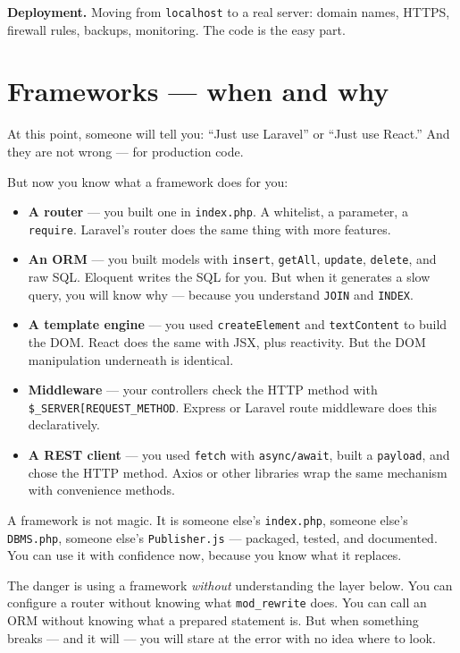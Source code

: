 \documentclass[11pt,a4paper,oneside]{book}
\providecommand{\tightlist}{%
  \setlength{\itemsep}{0pt}\setlength{\parskip}{0pt}}
\begin{document}
\textbf{Deployment.} Moving from \texttt{localhost} to a real
server: domain names, HTTPS, firewall rules, backups, monitoring.
The code is the easy part.

\hypertarget{frameworks-when-and-why}{%
\section{Frameworks --- when and
why}\label{frameworks-when-and-why}}

At this point, someone will tell you: ``Just use Laravel'' or
``Just use React.'' And they are not wrong --- for production
code.

But now you know what a framework does for you:

\begin{itemize}
\tightlist
\item
  \textbf{A router} --- you built one in \texttt{index.php}. A
  whitelist, a parameter, a \texttt{require}. Laravel's router
  does the same thing with more features.
\item
  \textbf{An ORM} --- you built models with \texttt{insert},
  \texttt{getAll}, \texttt{update}, \texttt{delete}, and raw SQL.
  Eloquent writes the SQL for you. But when it generates a slow
  query, you will know why --- because you understand
  \texttt{JOIN} and \texttt{INDEX}.
\item
  \textbf{A template engine} --- you used \texttt{createElement}
  and \texttt{textContent} to build the DOM. React does the same
  with JSX, plus reactivity. But the DOM manipulation underneath
  is identical.
\item
  \textbf{Middleware} --- your controllers check the HTTP method
  with
  \texttt{\$\_SERVER{[}\textquotesingle{}REQUEST\_METHOD\textquotesingle{}{]}}.
  Express or Laravel route middleware does this declaratively.
\item
  \textbf{A REST client} --- you used \texttt{fetch} with
  \texttt{async/await}, built a \texttt{payload}, and chose the
  HTTP method. Axios or other libraries wrap the same mechanism
  with convenience methods.
\end{itemize}

A framework is not magic. It is someone else's
\texttt{index.php}, someone else's \texttt{DBMS.php}, someone
else's \texttt{Publisher.js} --- packaged, tested, and
documented. You can use it with confidence now, because you know
what it replaces.

The danger is using a framework \emph{without} understanding the
layer below. You can configure a router without knowing what
\texttt{mod\_rewrite} does. You can call an ORM without knowing
what a prepared statement is. But when something breaks --- and
it will --- you will stare at the error with no idea where to
look.
\end{document}
